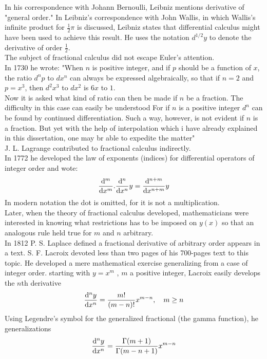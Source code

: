 \documentclass[twoside]{book}
\begin{document}
{In his correspondence with Johann Bernoulli, Leibniz mentions derivative of "general order." In Leibniz's correspondence with John Wallis, in which Wallis's infinite product for $\frac{1}{2} \pi$ is discussed, Leibniz states that differential calculus might have been used to achieve this result. He uses the notation $d^{1/2}y$ to denote the derivative of order $\frac{1}{2}$.\\
\newline
The subject of fractional calculus did not escape Euler's attention.\\
In 1730 he wrote: "When  $n$ is positive integer, and if $p$ should be a function of $x$, the ratio $d^{n}p$ to $dx^n$ can always be expressed algebraically, so that if $n=2$ and $p=x^3$, then $d^2 x^3$ to $dx^2$ is $6x$ to $1$.\\ Now it is asked what kind of ratio can then be made if $n$ be a fraction. The difficulty in this case can easily be understood
For if $n$  is a positive integer $d^n$ can be found by continued differentiation. Such a way, however, is not evident if $n$ is a fraction. But yet with the help of interpolation which i have already explained in this dissertation, one may br able to expedite the matter"\\
J. L. Lagrange contributed to fractional calculus indirectly.\\
In 1772 he developed the law of exponents (indices) for differential operators of integer order and wote:
$$\dv[m]{}{x} . \dv[n]{}{x} y = \dv[n+m]{}{x} y$$
In modern notation the dot is omitted, for it is not a multiplication.\\
Later, when the theory of fractional calculus developed, mathematicians were interested in knowing what restrictions has to be imposed on $y(x)$ so that an analogous rule held true for $m$ and $n$ arbitrary.\\
In 1812 P. S. Laplace defined a fractional derivative of arbitrary order appears in a text. S. F. Lacroix devoted less than two pages of his 700-pages text to this topic. He developed a mere mathematical exercise generalizing from a case of integer order. starting with $y=x^m$ , $m$ a positive integer, Lacroix easily develops the $n$th derivative
$$\dv[n]{y}{x} = \frac{m!}{(m-n)!} x^{m-n} , \quad  m \geq n $$
Using Legendre's symbol for the generalized fractional (the gamma function), he generalizations
\begin{equation}
    \label{1.2}
    \dv[n]{y}{x} = \frac{\Gamma{(m+1)}}{\Gamma{(m-n+1)}}x^{m-n}
\end{equation}

}
\end{document}
